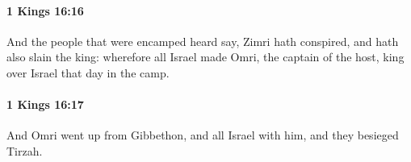 		\paragraph{1 Kings 16:16} %
			\label{1KINGS-16-16}

			And the people that were encamped heard say, Zimri hath conspired, and hath also slain the king: wherefore all Israel made Omri, the captain of the host, king over Israel that day in the camp.


		\paragraph{1 Kings 16:17} %
			\label{1KINGS-16-17}

			And Omri went up from Gibbethon, and all Israel with him, and they besieged Tirzah.


